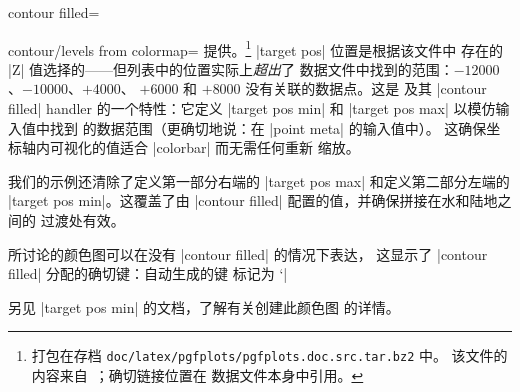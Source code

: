 {{\begin{plottype}[/pgfplots]{
    contour filled=\textcolor{black}{}%
}
\begin{pgfplotskey}{contour/levels from colormap=}
        提供。\footnote{打包在存档
        \texttt{doc/latex/pgfplots/pgfplots.doc.src.tar.bz2} 中。
        该文件的内容来自~\cite{LiveAccessServer}；确切链接位置在
        数据文件本身中引用。} |target pos| 位置是根据该文件中
        存在的 |Z| 值选择的——但列表中的位置实际上\emph{超出}了
        数据文件中找到的范围：$-12000$、$-10000$、$+4000$、
        $+6000$ 和 $+8000$ 没有关联的数据点。这是 \PGFPlots{}
        及其 |contour filled| handler 的一个特性：它定义
        |target pos min| 和 |target pos max| 以模仿输入值中找到
        的数据范围（更确切地说：在 |point meta| 的输入值中）。
        这确保坐标轴内可视化的值适合 |colorbar| 而无需任何重新
        缩放。

        我们的示例还清除了定义第一部分右端的 |target pos max|
        和定义第二部分左端的 |target pos min|。这覆盖了由
        |contour filled| 配置的值，并确保拼接在水和陆地之间的
        过渡处有效。

        所讨论的颜色图可以在没有 |contour filled| 的情况下表达，
        这显示了 |contour filled| 分配的确切键：自动生成的键
        标记为 `|%
\begin{codeexample}[]
\pgfplotscolorbardrawstandalone[
    colormap={whiteblue}{color=(blue) color=(white)},
    colormap={gb}{color=(green)
        color=(yellow) color=(brown)},
    colorbar style={minor x tick num=1},
    point meta min=-7052,               %
    point meta max=2895,                %
    of colormap/target pos min*=-7052,  %
    of colormap/target pos max*=2895,   %
    of colormap/sample for=const,       %
    colormap access=const,              %
    colormap={CM}{
        of colormap={
            whiteblue,
            target pos max=,
            target pos={-12000,-10000,-6000,-5000,
              -3000,-1000,-750,-500,-250,-100,-50,0}
        },
        of colormap={
            gb,
            target pos min=,
            target pos={10,100,200,500,1000,1100,
                1200,1500,2000,4000,6000,8000}
        },
    },
]
\end{codeexample}
        \noindent 另见 |target pos min| 的文档，了解有关创建此颜色图
        的详情。


\end{pgfplotskey}
\end{plottype}}}
